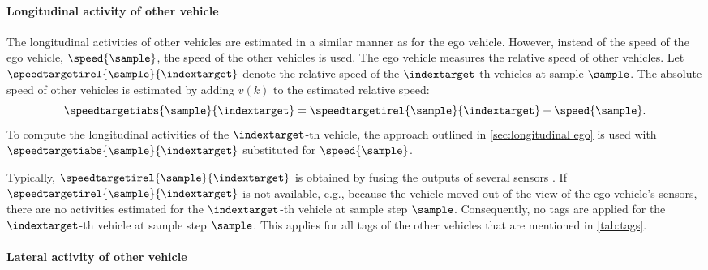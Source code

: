 \paragraph{Longitudinal activity of other vehicle}
\label{sec:longitudinal other vehicles}

The longitudinal activities of other vehicles are estimated in a similar manner as for the ego vehicle. However, instead of the speed of the ego vehicle, $\speed{\sample}$, the speed of the other vehicles is used. The ego vehicle measures the relative speed of other vehicles. Let $\speedtargetirel{\sample}{\indextarget}$ denote the relative speed of the $\indextarget$-th vehicles at sample $\sample$. The absolute speed of other vehicles is estimated by adding $v(k)$ to the estimated relative speed:
\begin{equation}
	\speedtargetiabs{\sample}{\indextarget} = \speedtargetirel{\sample}{\indextarget} + \speed{\sample}.
\end{equation}
To compute the longitudinal activities of the $\indextarget$-th vehicle, the approach outlined in \cref{sec:longitudinal ego} is used with $\speedtargetiabs{\sample}{\indextarget}$ substituted for $\speed{\sample}$. 

\begin{remark}
	\label{rem:no target}
	Typically, $\speedtargetirel{\sample}{\indextarget}$ is obtained by fusing the outputs of several sensors \autocite{elfring2016effective}. 
	If $\speedtargetirel{\sample}{\indextarget}$ is not available, e.g., because the vehicle moved out of the view of the ego vehicle's sensors, there are no activities estimated for the $\indextarget$-th vehicle at sample step $\sample$. 
	Consequently, no tags are applied for the $\indextarget$-th vehicle at sample step $\sample$. This applies for all tags of the other vehicles that are mentioned in \cref{tab:tags}.
\end{remark}



\paragraph{Lateral activity of other vehicle}
\label{sec:lateral other vehicles}

